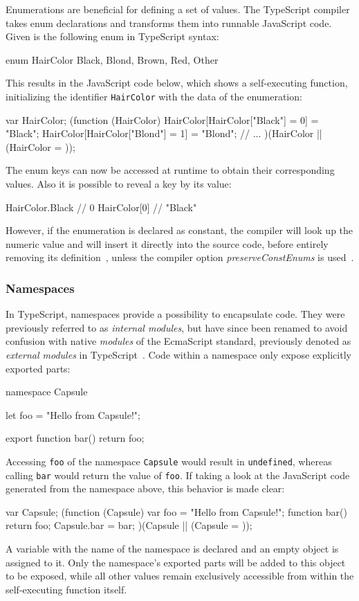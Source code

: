 Enumerations are beneficial for defining a set of values. The TypeScript compiler takes enum declarations and transforms them into runnable JavaScript code. Given is the following enum in TypeScript syntax:
\begin{JsCode}[numbers=none]
enum HairColor {
  Black, Blond, Brown, Red, Other
}
\end{JsCode}
This results in the JavaScript code below, which shows a self-executing function, initializing the identifier \texttt{HairColor} with the data of the enumeration:
\begin{JsCode}[numbers=none]
var HairColor;
(function (HairColor) {
    HairColor[HairColor["Black"] = 0] = "Black";
    HairColor[HairColor["Blond"] = 1] = "Blond";
    // ...
})(HairColor || (HairColor = {}));
\end{JsCode}
The enum keys can now be accessed at runtime to obtain their corresponding values. Also it is possible to reveal a key by its value:
\begin{JsCode}[numbers=none]
HairColor.Black // 0
HairColor[0] // "Black"
\end{JsCode}
However, if the enumeration is declared as constant, the compiler will look up the numeric value and will insert it directly into the source code, before entirely removing its definition~\cite{TypeScriptHandbook:Enums}, unless the compiler option \emph{preserveConstEnums} is used~\cite{TypeScriptHandbook:CompilerOptions}.

\subsubsection{Namespaces}
\label{sec:ts-namespaces}

In TypeScript, namespaces provide a possibility to encapsulate code. They were previously referred to as \emph{internal modules}, but have since been renamed to avoid confusion with native \emph{modules} of the EcmaScript standard, previously denoted as \emph{external modules} in TypeScript~\cite{TypeScriptHandbook:Namespaces}. Code within a namespace only expose explicitly exported parts:
\begin{JsCode}[numbers=none]
namespace Capsule {
  let foo = "Hello from Capsule!";
  
  export function bar() {
    return foo;
  }
}
\end{JsCode}
Accessing \texttt{foo} of the namespace \texttt{Capsule} would result in \texttt{undefined}, whereas calling \texttt{bar} would return the value of \texttt{foo}. If taking a look at the JavaScript code generated from the namespace above, this behavior is made clear:
\begin{JsCode}[numbers=none]
var Capsule;
(function (Capsule) {
    var foo = "Hello from Capsule!";
    function bar() {
        return foo;
    }
    Capsule.bar = bar;
})(Capsule || (Capsule = {}));
\end{JsCode}
A variable with the name of the namespace is declared and an empty object is assigned to it. Only the namespace's exported parts will be added to this object to be exposed, while all other values 
remain exclusively accessible from within the self-executing function itself.

